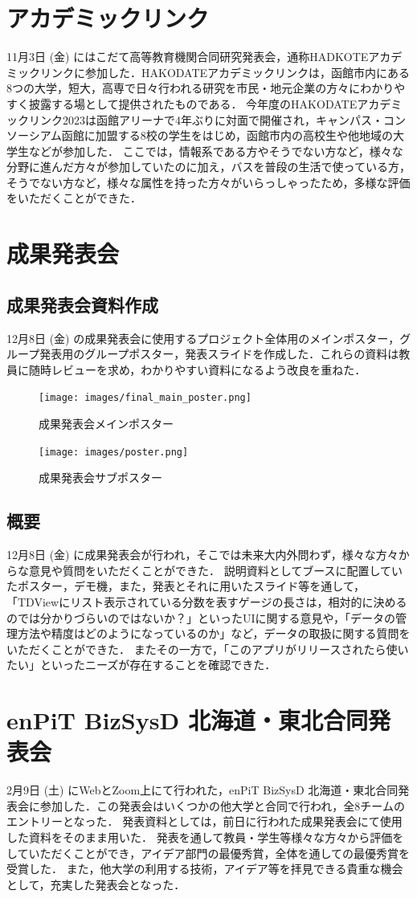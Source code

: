\section{アカデミックリンク}
11月3日 (金) にはこだて高等教育機関合同研究発表会，通称HADKOTEアカデミックリンクに参加した．HAKODATEアカデミックリンクは，函館市内にある8つの大学，短大，高専で日々行われる研究を市民・地元企業の方々にわかりやすく披露する場として提供されたものである．
今年度のHAKODATEアカデミックリンク2023は函館アリーナで4年ぶりに対面で開催され，キャンパス・コンソーシアム函館に加盟する8校の学生をはじめ，函館市内の高校生や他地域の大学生などが参加した．
ここでは，情報系である方やそうでない方など，様々な分野に進んだ方々が参加していたのに加え，バスを普段の生活で使っている方，そうでない方など，様々な属性を持った方々がいらっしゃったため，多様な評価をいただくことができた．

\section{成果発表会}
\subsection{成果発表会資料作成}
12月8日 (金) の成果発表会に使用するプロジェクト全体用のメインポスター，グループ発表用のグループポスター，発表スライドを作成した．これらの資料は教員に随時レビューを求め，わかりやすい資料になるよう改良を重ねた．

\begin{figure}[H]
    \centering
    \texttt{[image: images/final\_main\_poster.png]}
    \caption{成果発表会メインポスター}
    \label{fig:final_main_poster}
\end{figure}

\begin{figure}[H]
    \centering
    \texttt{[image: images/poster.png]}
    \caption{成果発表会サブポスター}
    \label{fig:poster}
\end{figure}


\subsection{概要}
12月8日 (金) に成果発表会が行われ，そこでは未来大内外問わず，様々な方々からな意見や質問をいただくことができた．
説明資料としてブースに配置していたポスター，デモ機，また，発表とそれに用いたスライド等を通して，「TDViewにリスト表示されている分数を表すゲージの長さは，相対的に決めるのでは分かりづらいのではないか？」といったUIに関する意見や，「データの管理方法や精度はどのようになっているのか」など，データの取扱に関する質問をいただくことができた．
またその一方で，「このアプリがリリースされたら使いたい」といったニーズが存在することを確認できた．

\section{enPiT BizSysD 北海道・東北合同発表会}
2月9日 (土) にWebとZoom上にて行われた，enPiT BizSysD 北海道・東北合同発表会に参加した．この発表会はいくつかの他大学と合同で行われ，全8チームのエントリーとなった．
発表資料としては，前日に行われた成果発表会にて使用した資料をそのまま用いた．
発表を通して教員・学生等様々な方々から評価をしていただくことができ，アイデア部門の最優秀賞，全体を通しての最優秀賞を受賞した．
また，他大学の利用する技術，アイデア等を拝見できる貴重な機会として，充実した発表会となった．
